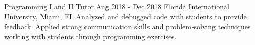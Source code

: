 \documentclass[letterpaper,10pt]{article}
\begin{document}
  \jobHeading
    {Programming I and II Tutor}
    {Aug 2018 - Dec 2018}
    {Florida International University, Miami, FL}
  \listStart
    \bulletItem
    {Analyzed and debugged code with students to provide feedback.}
    \bulletItem
    {Applied strong communication skills and problem-solving techniques working with students through programming exercises.}
  \listEnd

\sectionEnd

\end{document}
